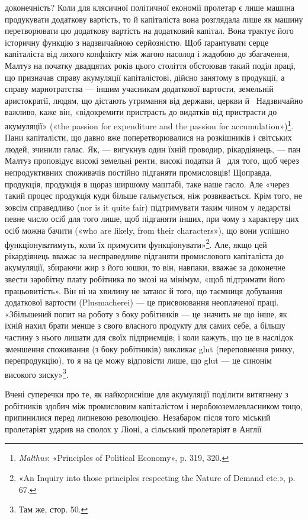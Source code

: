 \parcont{}  %
доконечність? Коли для клясичної політичної економії пролетар
є лише машина продукувати додаткову вартість, то
й капіталіста вона розглядала лише як машину перетворювати
цю додаткову вартість на додатковий капітал. Вона трактує
його історичну функцію з надзвичайною серйозністю. Щоб ґарантувати
серце капіталіста від лихого конфлікту між жагою
насолод і жадобою до збагачення, Малтуз на початку двадцятих
років цього століття обстоював такий поділ праці, що призначав
справу акумуляції капіталістові, дійсно занятому в продукції,
а справу марнотратства — іншим учасникам додаткової вартости,
земельній аристократії, людям, що дістають утримання від держави,
церкви й~ Надзвичайно важливо, каже він, «відокремити
пристрасть до видатків від пристрасти до акумуляції» («the
passion for expenditure and the passion for accumulation»)\footnote{
\emph{Malthus}: «Principles of Political Economy», p. 319, 320.
}.
Пани капіталісти, що давно вже поперетворювалися на розкішників
і світських людей, зчинили галас. Як, — вигукнув один
їхній проводир, рікардіянець, — пан Малтуз проповідує високі
земельні ренти, високі податки й~ для того, щоб через непродуктивних
споживачів постійно підганяти промисловців! Щоправда,
продукція, продукція в щораз ширшому маштабі, таке
наше гасло. Але «через такий процес продукція куди більше
гальмується, ніж розвивається. Крім того, не зовсім справедливо
(nor is it quite fair) підтримувати таким чином у ледарстві певне
число осіб для того лише, щоб підганяти інших, при чому з характеру
цих осіб можна бачити («who are likely, from their characters»),
що вони успішно функціонуватимуть, коли їх примусити
функціонувати»\footnote{
«An Inquiry into those principles respecting the Nature of Demand
etc.», p. 67.
}. Але, якщо цей рікардіянець вважає за несправедливе
підганяти промислового капіталіста до акумуляції,
збираючи жир з його юшки, то він, навпаки, вважає за доконечне
звести заробітну плату робітника по змозі на мінімум,
«щоб підтримати його працьовитість». Він ні на хвилину не
затаює й того, що таємниця добування додаткової вартости
(Plusmacherei) — це присвоювання неоплаченої праці. «Збільшений
попит на роботу з боку робітників — це значить не що
інше, як їхній нахил брати менше з свого власного продукту для
самих себе, а більшу частину з нього лишати для своїх підприємців;
і коли кажуть, що це в наслідок зменшення споживання
(з боку робітників) викликає glut (переповнення ринку, перепродукцію),
то я на це можу відповісти лише, що glut — це синонім
високого зиску»\footnote{
Там же, стор. 50.
}.

Вчені суперечки про те, як найкорисніше для акумуляції
поділити витягнену з робітників здобич між промисловим капіталістом
і неробою\dash{}землевласником тощо, припинилися перед
липневою революцією. Незабаром після того міський пролетаріят
ударив на сполох у Ліоні, а сільський пролетаріят в Англії
\parbreak{}  %
